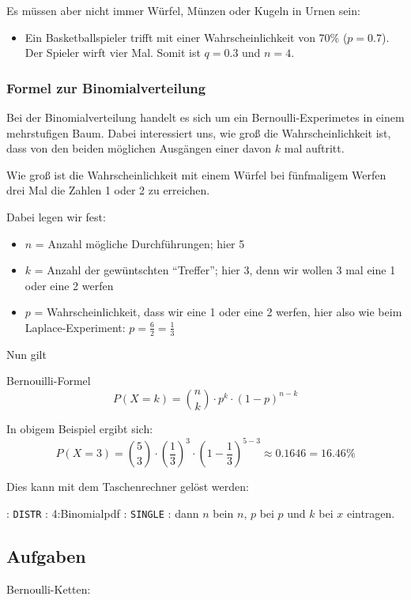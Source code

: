 Es müssen aber nicht immer Würfel, Münzen oder Kugeln in Urnen sein:

\begin{itemize}
\item
Ein Basketballspieler trifft mit einer Wahrscheinlichkeit von 70\%
($p=0.7$). Der Spieler wirft vier Mal. Somit ist $q=0.3$ und $n=4$.
\end{itemize}
\newpage


\subsubsection{Formel zur Binomialverteilung}
Bei der Binomialverteilung handelt es sich um ein
Bernoulli-Experimetes
in einem mehrstufigen Baum. Dabei interessiert
uns, wie groß die Wahrscheinlichkeit ist, dass von den beiden
möglichen Ausgängen einer davon $k$ mal auftritt.

Wie groß ist die Wahrscheinlichkeit mit einem Würfel bei fünfmaligem
Werfen drei Mal die Zahlen 1 oder 2 zu erreichen.

Dabei legen wir fest:
\begin{itemize}
\item
  $n$ = Anzahl mögliche Durchführungen; hier 5
\item
  $k$ = Anzahl der gewüntschten ``Treffer''; hier 3, denn wir wollen 3
mal eine 1 oder eine 2 werfen
\item
  $p$ = Wahrscheinlichkeit, dass wir eine 1 oder eine 2 werfen, hier
  also wie beim Laplace-Experiment: $p=\frac62=\frac13$
\end{itemize}

Nun gilt

\begin{gesetz}{Bernouilli-Formel}{}
  $$P(X=k) = {{n}\choose {k}}\cdot{}p^k\cdot{}(1-p)^{n-k}$$
\end{gesetz}

In obigem Beispiel ergibt sich:
$$P(X=3) =
{{5}\choose {3}} \cdot{}\left(\frac13\right)^3\cdot{}\left(1-\frac13\right)^{5-3}
\approx{} 0.1646 = 16.46\%$$

Dies kann mit dem Taschenrechner gelöst werden:

 : \texttt{DISTR} :  4:Binomialpdf :
\texttt{SINGLE} : dann $n$ bein $n$, $p$ bei $p$ und $k$ bei $x$ eintragen.
\newpage


\subsection*{Aufgaben}
Bernoulli-Ketten:

